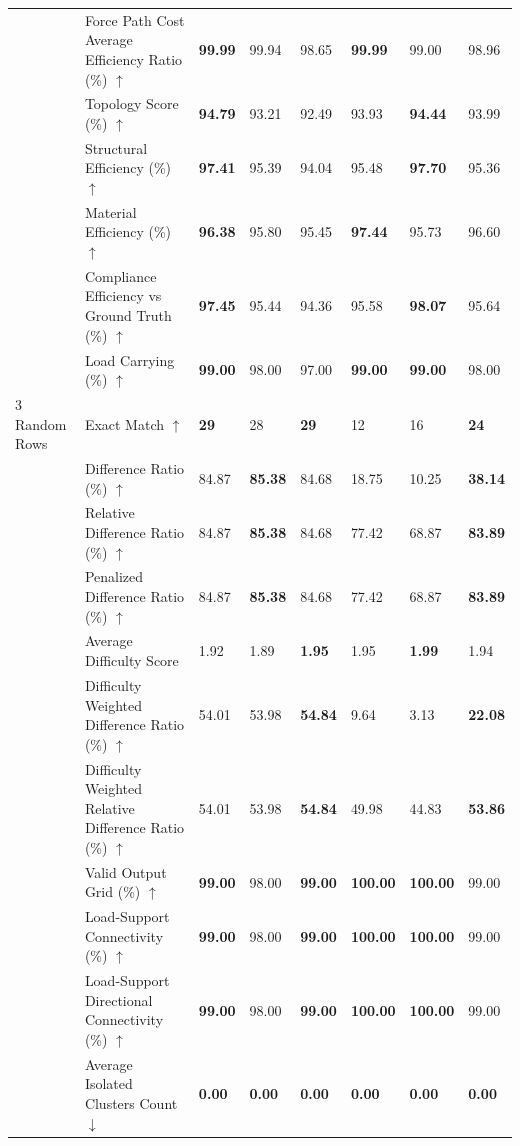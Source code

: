 \begin{table}[!h]
{\begin{tabular}{lllll|lll}
 & Force Path Cost Average Efficiency Ratio (\%) $\uparrow$ & \textbf{99.99} & 99.94 & 98.65 & \textbf{99.99} & 99.00 & 98.96 \\
 & Topology Score (\%) $\uparrow$ & \textbf{94.79} & 93.21 & 92.49 & 93.93 & \textbf{94.44} & 93.99 \\
 & Structural Efficiency (\%) $\uparrow$ & \textbf{97.41} & 95.39 & 94.04 & 95.48 & \textbf{97.70} & 95.36 \\
 & Material Efficiency (\%) $\uparrow$ & \textbf{96.38} & 95.80 & 95.45 & \textbf{97.44} & 95.73 & 96.60 \\
 & Compliance Efficiency vs Ground Truth (\%) $\uparrow$ & \textbf{97.45} & 95.44 & 94.36 & 95.58 & \textbf{98.07} & 95.64 \\
 & Load Carrying (\%) $\uparrow$ & \textbf{99.00} & 98.00 & 97.00 & \textbf{99.00} & \textbf{99.00} & 98.00 \\
\midrule
3 Random Rows & Exact Match $\uparrow$ & \textbf{29} & 28 & \textbf{29} & 12 & 16 & \textbf{24} \\
 & Difference Ratio (\%) $\uparrow$ & 84.87 & \textbf{85.38} & 84.68 & 18.75 & 10.25 & \textbf{38.14} \\
 & Relative Difference Ratio (\%) $\uparrow$ & 84.87 & \textbf{85.38} & 84.68 & 77.42 & 68.87 & \textbf{83.89} \\
 & Penalized Difference Ratio (\%) $\uparrow$ & 84.87 & \textbf{85.38} & 84.68 & 77.42 & 68.87 & \textbf{83.89} \\
 & Average Difficulty Score & 1.92 & 1.89 & \textbf{1.95} & 1.95 & \textbf{1.99} & 1.94 \\
 & Difficulty Weighted Difference Ratio (\%) $\uparrow$ & 54.01 & 53.98 & \textbf{54.84} & 9.64 & 3.13 & \textbf{22.08} \\
 & Difficulty Weighted Relative Difference Ratio (\%) $\uparrow$ & 54.01 & 53.98 & \textbf{54.84} & 49.98 & 44.83 & \textbf{53.86} \\
 & Valid Output Grid (\%) $\uparrow$ & \textbf{99.00} & 98.00 & \textbf{99.00} & \textbf{100.00} & \textbf{100.00} & 99.00 \\
 & Load-Support Connectivity (\%) $\uparrow$ & \textbf{99.00} & 98.00 & \textbf{99.00} & \textbf{100.00} & \textbf{100.00} & 99.00 \\
 & Load-Support Directional Connectivity (\%) $\uparrow$ & \textbf{99.00} & 98.00 & \textbf{99.00} & \textbf{100.00} & \textbf{100.00} & 99.00 \\
 & Average Isolated Clusters Count $\downarrow$ & \textbf{0.00} & \textbf{0.00} & \textbf{0.00} & \textbf{0.00} & \textbf{0.00} & \textbf{0.00} \\

\end{tabular}}
\end{table}
